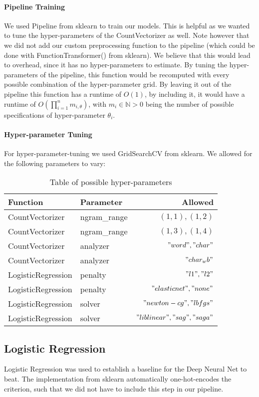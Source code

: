 \documentclass[fleqn,10pt]{SelfArx} %
\begin{document}
\paragraph{Pipeline Training} We used Pipeline from sklearn to train our models. This is helpful as we wanted to tune the hyper-parameters of the CountVectorizer as well. Note however that we did not add our custom preprocessing function to the pipeline (which could be done with FunctionTransformer() from sklearn). We believe that this would lead to overhead, since it has no hyper-parameters to estimate. By tuning the hyper-parameters of the pipeline, this function would be recomputed with every possible combination of the hyper-parameter grid. By leaving it out of the pipeline this function has a runtime of $O(1)$, by including it, it would have a runtime of $O(\prod\limits_{i = 1}^{n} m_{i,\theta})$, with $ m_i \in \mathbb{N} > 0$ being the number of possible specifications of hyper-parameter $\theta_i$.

\paragraph{Hyper-parameter Tuning}For hyper-parameter-tuning we used GridSearchCV from sklearn. We allowed for the following parameters to vary:
\begin{table}[hbt]
	\caption{Table of possible hyper-parameters}
	\centering
	\begin{tabular}{llr}
		\toprule
		 Function & Parameter & Allowed \\
		\midrule
		CountVectorizer & ngram\_range & $(1,1), (1,2)$ \\
		CountVectorizer & ngram\_range & $(1,3), (1,4)$ \\
		CountVectorizer & analyzer & $"word", "char"$ \\
		CountVectorizer & analyzer & $"char_wb"$ \\
		LogisticRegression & penalty & $"l1", "l2"$\\
		LogisticRegression & penalty & $"elasticnet", "none"$\\
		LogisticRegression & solver & $"newton-cg", "lbfgs"$\\
		LogisticRegression & solver & $ "liblinear", "sag", "saga"$\\
		\bottomrule
	\end{tabular}
	\label{tab:label}
\end{table}


\subsection{Logistic Regression}
Logistic Regression was used to establish a baseline for the Deep Neural Net to beat. The implementation from sklearn automatically one-hot-encodes the criterion, such that we did not have to include this step in our pipeline.
\end{document}
